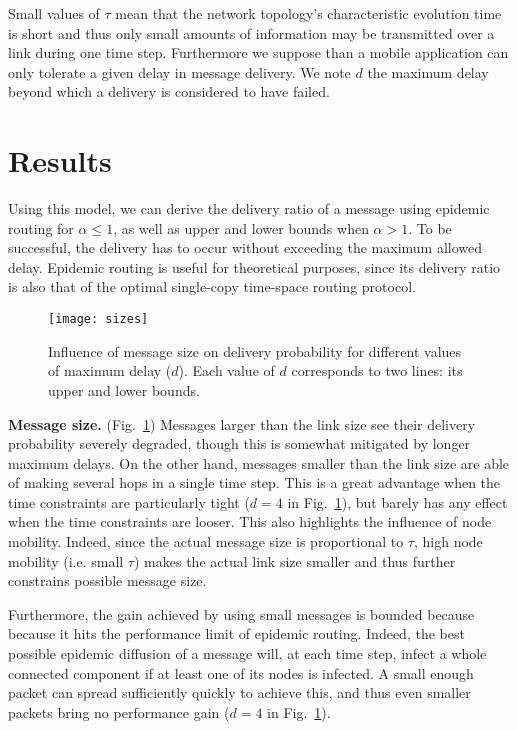 \documentclass{sig-alt-release2}
\begin{document}
Small values of $\tau$ mean that the network topology's
characteristic evolution time is short and thus only small amounts
of information may be transmitted over a link during one time
step. Furthermore we suppose than a mobile application can only
tolerate a given delay in message delivery. We note $d$ the maximum
delay beyond which a delivery is considered to have failed. 

\section{Results}
\label{sec:results}
Using this model, we can derive the delivery ratio of a message using
epidemic routing for $\alpha \le 1$, as well as upper and lower bounds
when $\alpha > 1$. To be successful, the delivery has to occur without
exceeding the maximum allowed delay. Epidemic routing is useful for
theoretical purposes, since its delivery ratio is also that of the
optimal single-copy time-space routing protocol.

\begin{figure}[t]
  \centering
  \texttt{[image: sizes]}
  \caption{Influence of message size on delivery probability for
    different values of maximum delay ($d$). Each value of $d$
    corresponds to two lines: its upper and lower bounds.}
  \label{param_size}
\end{figure}

\vspace{1mm}
\noindent\textbf{Message size.} (Fig.~\ref{param_size}) Messages
larger than the link size see their delivery probability severely
degraded, though this is somewhat mitigated by longer maximum
delays. On the other hand, messages smaller than the link size are
able of making several hops in a single time step. This is a great
advantage when the time constraints are particularly tight ($d=4$ in
Fig.~\ref{param_size}), but barely has any effect when the time
constraints are looser. This also highlights the influence of node
mobility. Indeed, since the actual message size is proportional to
$\tau$, high node mobility (i.e. small $\tau$) makes the actual link
size smaller and thus further constrains possible message size.

Furthermore, the gain achieved by using small messages is bounded
because because it hits the performance limit of epidemic
routing. Indeed, the best possible epidemic diffusion of a message
will, at each time step, infect a whole connected component if at
least one of its nodes is infected. A small enough packet can spread
sufficiently quickly to achieve this, and thus even smaller packets
bring no performance gain ($d=4$ in Fig.~\ref{param_size}).
\end{document}
